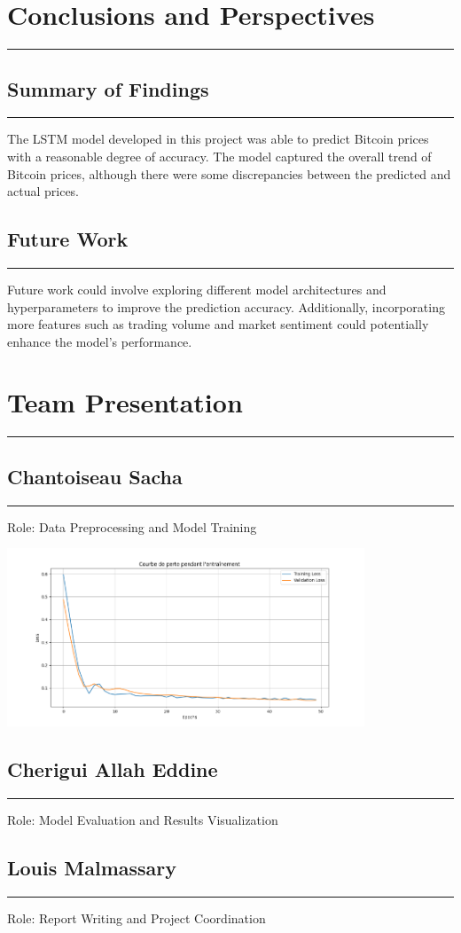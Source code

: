 \documentclass{article}
\begin{document}
\section{Conclusions and Perspectives}
\noindent\rule{\textwidth}{1pt} %
\subsection{Summary of Findings}
\noindent\rule{\textwidth}{1pt} %
The LSTM model developed in this project was able to predict Bitcoin prices with a reasonable degree of accuracy. The model captured the overall trend of Bitcoin prices, although there were some discrepancies between the predicted and actual prices.


\subsection{Future Work}
\noindent\rule{\textwidth}{1pt} %
Future work could involve exploring different model architectures and hyperparameters to improve the prediction accuracy. Additionally, incorporating more features such as trading volume and market sentiment could potentially enhance the model's performance.

\section{Team Presentation}
\noindent\rule{\textwidth}{1pt} %
\subsection{Chantoiseau Sacha}
\noindent\rule{\textwidth}{1pt} %
Role: Data Preprocessing and Model Training

\includegraphics[width=0.8\textwidth]{img/courbe_perte.png}
\subsection{Cherigui Allah Eddine}
\noindent\rule{\textwidth}{1pt} %
Role: Model Evaluation and Results Visualization

\subsection{Louis Malmassary}
\noindent\rule{\textwidth}{1pt} %
Role: Report Writing and Project Coordination
\end{document}
